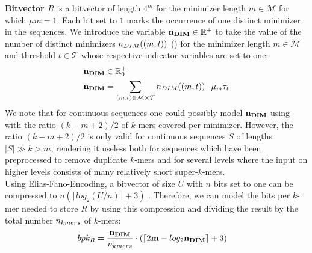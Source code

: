 \documentclass[a4paper,titlepage,onecolumn,oneside,12pt,nenglish,titlepage=firstiscover]{scrbook}
\theoremstyle{plain} %
\theoremstyle{definition} %
\theoremstyle{remark} %
\theoremstyle{plain}
\newcommand{\RR}{\mathbb{R}} %
\newcommand{\minimizerLength}{m}
\newcommand{\threshold}{t}
\newcommand{\possibleMinimizerLengths}{\mathcal{M}}
\newcommand{\possibleThresholds}{\mathcal{T}}
\newcommand{\indicatorm}{\mu}
\newcommand{\indicatort}{\tau}
\newcommand{\varMinimizerLength}{\textbf{\minimizerLength}}
\begin{document}
\textbf{Bitvector $R$} is a bitvector of length $4^\minimizerLength$ for the minimizer length $\minimizerLength \in \possibleMinimizerLengths$ for which $\indicatorm\minimizerLength = 1$. Each bit set to $1$ marks the occurrence of one distinct \infrequent minimizer in the sequences. We introduce the variable $\varNumberOfDistinctMinimizers \in \RR^+$ to take the value of the number of distinct \infrequent minimizers $\numberOfDistinctMinimizers{(\minimizerLength, \threshold)}$ () for the minimizer length $\minimizerLength \in \possibleMinimizerLengths$ and threshold $\threshold \in \possibleThresholds$ whose respective indicator variables are set to one:
\newcommand{\nDIMExpression}{
	\varNumberOfDistinctMinimizers &= \sum\limits_{(\minimizerLength, \threshold) \in \possibleMinimizerLengths \times \possibleThresholds}
	\numberOfDistinctMinimizers{(\minimizerLength, \threshold)} \cdot
	\indicatorm_\minimizerLength \indicatort_\threshold
}
\begin{align}
	\varNumberOfDistinctMinimizers &\in \RR^+_0 \label{variable:nDIM}\\
	\nDIMExpression \label{constraint:nDIM}
\end{align}
We note that for continuous sequences one could possibly model $\textbf{n}_{\textbf{DIM}}$ using with the ratio $(k-\minimizerLength+2)/2$ of $k$-mers covered per minimizer. However, the ratio $(k-\minimizerLength+2)/2$ is only valid for continuous sequences $S$ of lengths $|S| \gg k > \minimizerLength$, rendering it useless both for sequences which have been preprocessed to remove duplicate $k$-mers and for several levels where the input on higher levels consists of many relatively short super-$k$-mers.\\

Using Elias-Fano-Encoding, a bitvector of size $U$ with $n$ bits set to one can be compressed to
$n (\lceil log_2(U/n) \rceil + 3)$ \cite{okanohara2007practical}. Therefore, we can model the bits per $k$-mer needed to store $R$ by using this compression and dividing the result by the total number $n_{kmers}$ of $k$-mers:
\newcommand{\bpkR}{bpk_{R} &= \frac{\varNumberOfDistinctMinimizers}{\nkmers} \cdot \left(\lceil 2\varMinimizerLength - log_2\varNumberOfDistinctMinimizers \rceil + 3 \right)}
\begin{align}
	\bpkR \label{constraint:bpkR}
\end{align}
\end{document}
